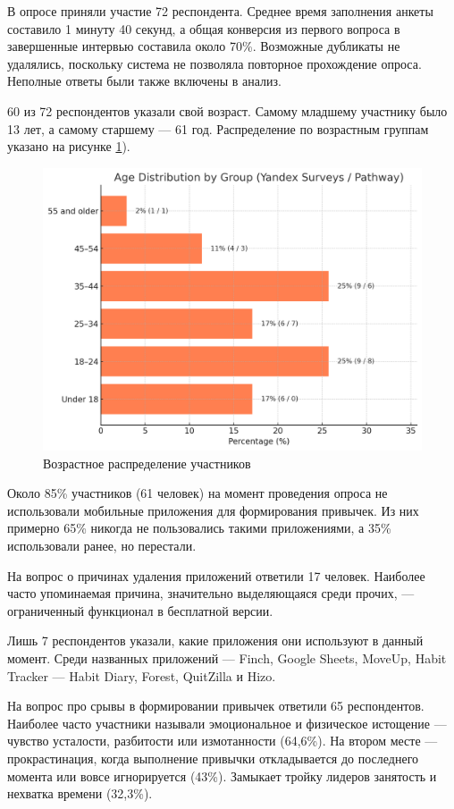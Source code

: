 \documentclass[pdflatex,sn-mathphys-num]{sn-jnl}%
\theoremstyle{thmstyleone}%
\theoremstyle{thmstyletwo}%
\theoremstyle{thmstylethree}%
\begin{document}
В опросе приняли участие 72 респондента. Среднее время заполнения анкеты составило 1 минуту 40 секунд, а общая конверсия из первого вопроса в завершенные интервью составила около 70\%. Возможные дубликаты не удалялись, поскольку система не позволяла повторное прохождение опроса. Неполные ответы были также включены в анализ.

60 из 72 респондентов указали свой возраст. Самому младшему участнику было 13 лет, а самому старшему — 61 год. Распределение по возрастным группам указано на рисунке \ref{fig:survey_age}).

\begin{figure}
    \centering
    \includegraphics[width=1\linewidth]{figures/survey_age.png}
    \caption{Возрастное распределение участников}
    \label{fig:survey_age}
\end{figure}

Около 85\% участников (61 человек) на момент проведения опроса не использовали мобильные приложения для формирования привычек. Из них примерно 65\% никогда не пользовались такими приложениями, а 35\% использовали ранее, но перестали.

На вопрос о причинах удаления приложений ответили 17 человек. Наиболее часто упоминаемая причина, значительно выделяющаяся среди прочих, — ограниченный функционал в бесплатной версии.

Лишь 7 респондентов указали, какие приложения они используют в данный момент. Среди названных приложений — Finch, Google Sheets, MoveUp, Habit Tracker — Habit Diary, Forest, QuitZilla и Hizo.

На вопрос про срывы в формировании привычек ответили 65 респондентов. Наиболее часто участники называли эмоциональное и физическое истощение — чувство усталости, разбитости или измотанности (64,6\%). На втором месте — прокрастинация, когда выполнение привычки откладывается до последнего момента или вовсе игнорируется (43\%). Замыкает тройку лидеров занятость и нехватка времени (32,3\%).
\end{document}
